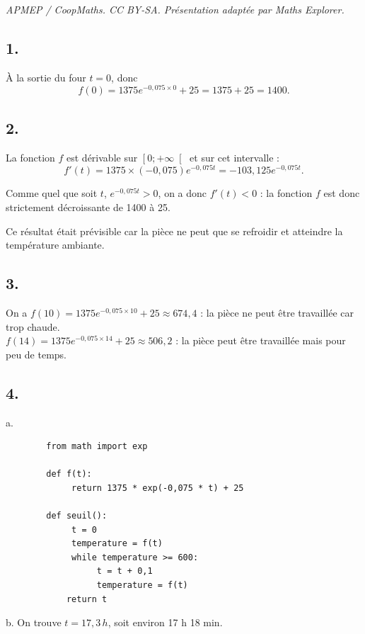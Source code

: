 \documentclass[10pt]{article}
\begin{document}
\noindent\textit{APMEP / CoopMaths. CC BY-SA. Présentation adaptée par Maths Explorer.}\par\medskip
\subsection*{1.}
	
	À la sortie du four \(t = 0\), donc
	\[
	f(0) = 1375e^{-0,075 \times 0} + 25 = 1375 + 25 = 1400.
	\]
	
	\subsection*{2.}
	
	La fonction \(f\) est dérivable sur \(\left[0 ; +\infty\right[\) et sur cet intervalle :
	\[
	f'(t) = 1375 \times (-0,075)e^{-0,075t} = -103,125e^{-0,075t}.
	\]
	
	Comme quel que soit \(t\), \(e^{-0,075t} > 0\), on a donc \(f'(t) < 0\) : la fonction \(f\) est donc strictement décroissante de 1400 à 25.
	
	Ce résultat était prévisible car la pièce ne peut que se refroidir et atteindre la température ambiante.
	
	\subsection*{3.}
	
	On a
$
	f(10) = 1375e^{-0,075 \times 10} + 25 \approx 674,4$ : la pièce ne peut être travaillée car trop chaude.\\
$
	f(14) = 1375e^{-0,075 \times 14} + 25 \approx 506,2$ : la pièce peut être travaillée mais pour peu de temps.

	
	\subsection*{4.}
	
	a. 	\begin{verbatim}
		from math import exp
		
		def f(t):
		     return 1375 * exp(-0,075 * t) + 25
		
		def seuil():
		     t = 0
		     temperature = f(t)
		     while temperature >= 600:
		          t = t + 0,1
		          temperature = f(t)
	    	return t
	\end{verbatim}
	
	
	
	
	
	b. On trouve \(t = 17,3 \, h\), soit environ 17 h 18 min.
\end{document}
